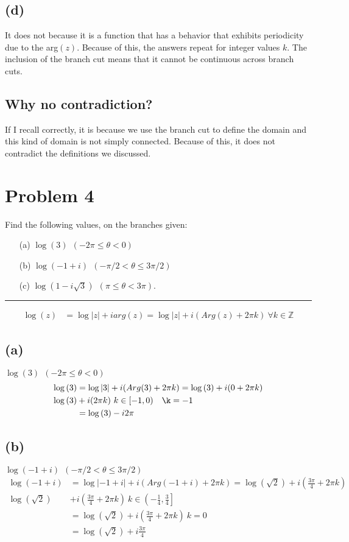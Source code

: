 \documentclass{article}
\begin{document}
\subsection*{(d)}
It does not because it is a function that has a behavior that exhibits periodicity due to the arg$(z)$. Because of this, the answers repeat for integer values $k$. The inclusion of the branch cut means that it cannot be continuous across branch cuts.
\subsection*{Why no contradiction?}
If I recall correctly, it is because we use the branch cut to define the domain and this kind of domain is not simply connected. Because of this, it does not contradict the definitions we discussed.
\newpage
\section*{Problem 4}
Find the following values, on the branches given:
\begin{enumerate}
	\item [(a)] $ \log(3) \ \ (-2\pi \leq \theta < 0)$ 
	\item [(b)] $ \log(-1 + i) \ \ (-\pi/2 < \theta \leq 3 \pi / 2)$
	\item [(c)] $ \log(1 - i \sqrt 3) \ \ (\pi \leq \theta < 3 \pi)$.
\end{enumerate}
\hrule
\vspace{.5cm} %

\begin{align*}
  \log(z) &= \log{|z|} + iarg(z) = \log{|z|} + i(Arg(z) + 2\pi k)\ \forall k \in \mathbb{Z}
\end{align*}
\subsection*{(a)}
$ \log{(3)} \ \ (-2\pi \leq \theta < 0)$
\begin{align*}
  \log{(3)} &=  \log{|3|} + i(Arg(3) + 2\pi k)= \log{(3)} + i(0 +  2\pi k)\\
  \log{(3)} &+ i(2\pi k)\ k \in [-1,0) \quad \k = -1\\
  &= \log{(3)} - i2\pi
\end{align*}
\subsection*{(b)}
$ \log(-1 + i) \ \ (-\pi/2 < \theta \leq 3 \pi / 2)$
\begin{align*}
  \log{(-1 + i)} &=  \log{|-1 + i|} + i(Arg(-1 + i) + 2\pi k)= \log{(\sqrt{2})} + i\left(\frac{3\pi}{4} +  2\pi k\right)\\
  \log{(\sqrt{2})} &+ i\left(\frac{3\pi}{4}+2\pi k\right)\ k \in \left(-\frac{1}{4}, \frac{3}{4}\right]\\
                 &= \log{(\sqrt{2})} + i\left(\frac{3\pi}{4}+2\pi k\right) \ k = 0\\
                 &= \log{(\sqrt{2})} + i\frac{3\pi}{4}
\end{align*}
\end{document}
